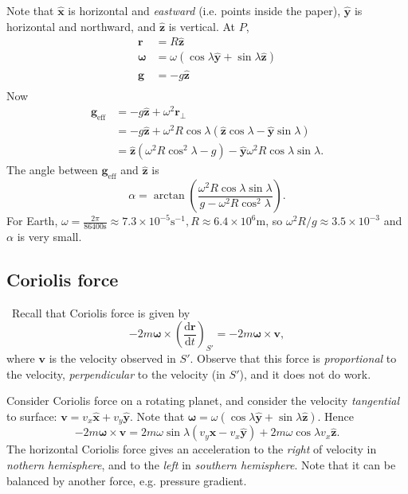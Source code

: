 Note that $ \hat{\mathbf{x}} $ is horizontal and \textit{eastward} (i.e. points inside the paper), $ \hat{\mathbf{y}} $ is horizontal and northward, and $ \hat{\mathbf{z}} $ is vertical. At $P$,
\begin{align*}
    \mathbf{r} &= R\hat{\mathbf{z}}\\
    \boldsymbol\omega &= \omega(\cos\lambda \hat{\mathbf{y}} + \sin \lambda \hat{\mathbf{z}})\\
    \mathbf{g} &= -g\hat{\mathbf{z}}\\
\end{align*}
Now 
\begin{align*}
    \mathbf{g}_{\text{eff}} &= -g \hat{\mathbf{z}}+ \omega^2 \mathbf{r}_\perp\\ 
    &=  -g \hat{\mathbf{z}}+ \omega^2 R \cos \lambda(\hat{\mathbf{z}} \cos \lambda-\hat{\mathbf{y}}\sin \lambda)\\
    &= \hat{\mathbf{z}}(\omega^2 R \cos^2 \lambda-g)- \hat{\mathbf{y}}\omega^2 R \cos \lambda \sin \lambda.
\end{align*}
The angle between $ \mathbf{g}_{\text{eff}} $ and $ \hat{\mathbf{z}} $ is 
\[
    \alpha = \arctan \left( \frac{\omega^2 R \cos \lambda \sin \lambda}{g-\omega^2 R \cos^2 \lambda} \right).
\]
For Earth, $ \omega=\frac{2\pi}{86400\mathrm{s}}\approx 7.3 \times 10^{-5}\mathrm{s}^{-1},R \approx 6.4 \times 10^6 \mathrm{m} $, so $ \omega^2 R/g \approx 3.5 \times 10^{-3} $ and $ \alpha $ is very small.
\subsection{Coriolis force}\
Recall that Coriolis force is given by 
\[
    -2m\boldsymbol{\omega}\times \left( \frac{\mathrm{d}\mathbf{r}}{\mathrm{d}t}  \right)_{S'} = -2m \boldsymbol{\omega} \times \mathbf{v},
\]
where $ \mathbf{v} $ is the velocity observed in $ S' $. Observe that this force is \textit{proportional} to the velocity, \textit{perpendicular} to the velocity (in $S'$), and it does not do work.

Consider Coriolis force on a rotating planet, and consider the velocity \textit{tangential} to surface: $ \mathbf{v} = v_x \hat{\mathbf{x}}+ v_y \hat{\mathbf{y}} $. Note that $ \boldsymbol{\omega}=\omega( \cos \lambda \hat{\mathbf{y}}+ \sin \lambda \hat{\mathbf{z}}) $. Hence 
\[
    -2m \boldsymbol{\omega}\times \mathbf{v} = 2m\omega \sin \lambda \left( v_y \hat{\mathbf{x}}-v_x \hat{\mathbf{y}} \right)+2m\omega \cos \lambda v_x \hat{\mathbf{z}}.
\]
The horizontal Coriolis force gives an acceleration to the \textit{right} of velocity in \textit{nothern hemisphere}, and to the \textit{left} in \textit{southern hemisphere}. Note that it can be balanced by another force, e.g. pressure gradient.

